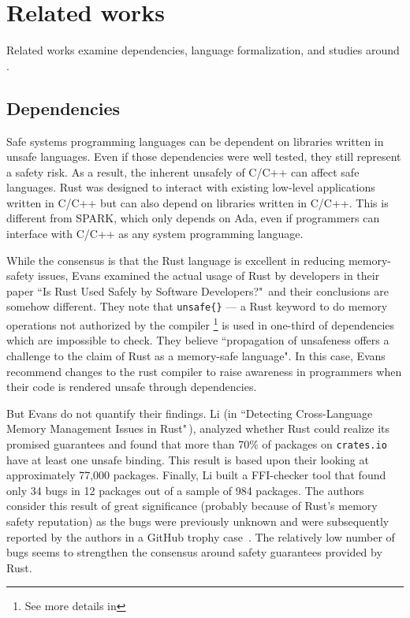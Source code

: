 \documentclass[nomenclature, english, bibtex]{kththesis}
\begin{document}
\cleardoublepage

\chapter{Related works}
\label{ch:relatedworks}

Related works examine dependencies, language formalization, and studies around .

\section{Dependencies}
\label{subsec:dependencies}

Safe systems programming languages can be dependent on libraries written in unsafe languages. Even if those dependencies were well tested, they still represent a safety risk. As a result, the inherent unsafely of C/C++ can affect safe languages. Rust was designed to interact with existing low-level applications written in C/C++ but can also depend on libraries written in C/C++. This is different from SPARK, which only depends on Ada, even if programmers can interface with C/C++ as any system programming language.

While the consensus is that the Rust language is excellent in reducing memory-safety issues, Evans \etal examined the actual usage of Rust by developers in their paper ``Is Rust Used Safely by Software Developers?"\,\cite{evans_is_2020} and their conclusions are somehow different. They note that \texttt{unsafe\{\}} --- a Rust keyword to do memory operations not authorized by the compiler \footnote{See more details in } is used in one-third of dependencies which are impossible to check. They believe ``propagation of unsafeness offers a challenge to the claim of Rust as a memory-safe language". In this case, Evans \etal recommend changes to the rust compiler to raise awareness in programmers when their code is rendered unsafe through dependencies. 

But Evans \etal do not quantify their findings. Li \etal (in ``Detecting Cross-Language Memory Management Issues in Rust"\,\cite{li_detecting_2022}), analyzed whether  Rust could realize its promised guarantees and found that more than 70\% of packages on \texttt{crates.io} have at least one unsafe binding. This result is based upon their looking at approximately 77,000 packages. Finally, Li \etal built a \gls{FFI}-checker tool that found only 34 bugs in 12 packages out of a sample of 984 packages. The authors consider this result of great significance (probably because of Rust's memory safety reputation) as the bugs were previously unknown and were subsequently reported by the authors in a GitHub trophy case \,\cite{li_rust-ffi-checkertrophy-case_nodate}. The relatively low number of bugs seems to strengthen the consensus around safety guarantees provided by Rust.
\end{document}
